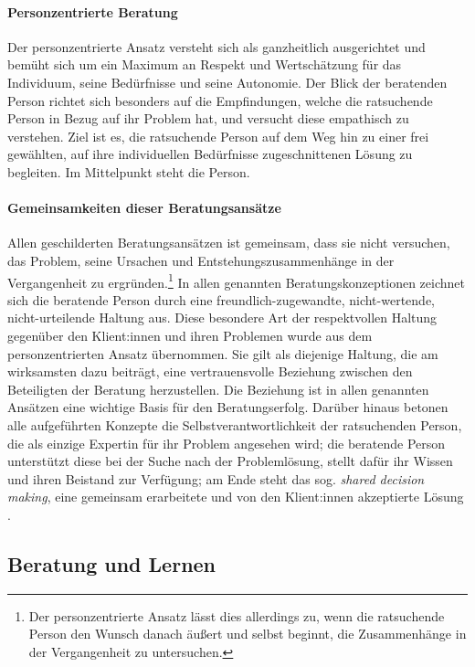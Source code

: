 \documentclass[
  twoside,
  parskip=half-,
  paper=176mm:246mm,
  BCOR=14mm,
  DIV=14,
]{scrreprt}
\begin{document}
\paragraph{Personzentrierte Beratung}
Der personzentrierte Ansatz versteht sich als ganzheitlich ausgerichtet und bemüht sich um ein Maximum an Respekt und Wertschätzung für das Individuum, seine Bedürfnisse und seine Autonomie. Der Blick der beratenden Person richtet sich besonders auf die Empfindungen, welche die ratsuchende Person in Bezug auf ihr Problem hat, und versucht diese empathisch zu verstehen. Ziel ist es, die ratsuchende Person auf dem Weg hin zu einer frei gewählten, auf ihre individuellen Bedürfnisse zugeschnittenen Lösung zu begleiten. Im Mittelpunkt steht die Person.

\paragraph{Gemeinsamkeiten dieser Beratungsansätze}

Allen geschilderten Beratungsansätzen ist gemeinsam, dass sie nicht versuchen, das Problem, seine Ursachen und Entstehungszusammenhänge in der Vergangenheit zu ergründen.\footnote{Der personzentrierte Ansatz lässt dies allerdings zu, wenn die ratsuchende Person den Wunsch danach äußert und selbst beginnt, die Zusammenhänge in der Vergangenheit zu untersuchen.} 
In allen genannten Beratungskonzeptionen zeichnet sich die beratende Person durch eine freundlich-zugewandte, nicht-wertende, nicht-urteilende Haltung aus. Diese besondere Art der respektvollen Haltung gegenüber den Klient:innen und ihren Problemen wurde aus dem personzentrierten Ansatz übernommen. Sie gilt als diejenige Haltung, die am wirksamsten dazu beiträgt, eine vertrauensvolle Beziehung zwischen den Beteiligten der Beratung herzustellen. Die Beziehung ist in allen genannten Ansätzen eine wichtige Basis für den Beratungserfolg. Darüber hinaus betonen alle aufgeführten Konzepte die Selbstverantwortlichkeit der ratsuchenden Person, die als einzige Expertin für ihr Problem angesehen wird; die beratende Person unterstützt diese bei der Suche nach der Problemlösung, stellt dafür ihr Wissen und ihren Beistand zur Verfügung; am Ende steht das sog. \textit{shared decision making}, eine gemeinsam erarbeitete und von den Klient:innen akzeptierte Lösung \autocite[127]{hacker2021}.

\subsection{Beratung und Lernen}
\end{document}
